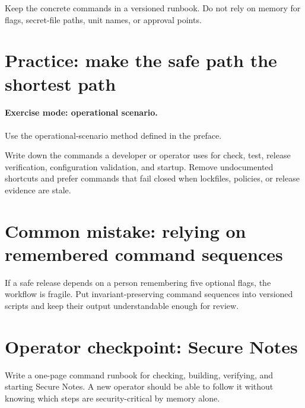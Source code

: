 Keep the concrete commands in a versioned runbook. Do not rely on memory for flags, secret-file paths, unit names, or approval points.

\section{Practice: make the safe path the shortest path}
\paragraph{Exercise mode: operational scenario.} Use the operational-scenario method defined in the preface.

Write down the commands a developer or operator uses for check, test, release verification, configuration validation, and startup. Remove undocumented shortcuts and prefer commands that fail closed when lockfiles, policies, or release evidence are stale.

\section{Common mistake: relying on remembered command sequences}
If a safe release depends on a person remembering five optional flags, the workflow is fragile. Put invariant-preserving command sequences into versioned scripts and keep their output understandable enough for review.

\section{Operator checkpoint: Secure Notes}
Write a one-page command runbook for checking, building, verifying, and starting Secure Notes. A new operator should be able to follow it without knowing which steps are security-critical by memory alone.
